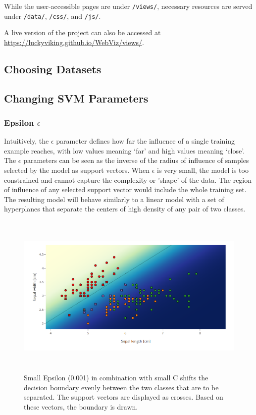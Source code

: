\documentclass{scrartcl}
\begin{document}
While the user-accessible pages are under \verb|/views/|,
necessary resources are served under
\verb|/data/|, \verb|/css/|, and \verb|/js/|.

A live version of the project can also be accessed at
\url{https://luckyviking.github.io/WebViz/views/}.

\subsection{Choosing Datasets}


\subsection{Changing SVM Parameters}

\subsubsection*{Epsilon $\epsilon$}
Intuitively, the $\epsilon$ parameter defines how far the influence of a single training example reaches, with low values meaning ‘far’ and high values meaning ‘close’. The $\epsilon$ parameters can be seen as the inverse of the radius of influence of samples selected by the model as support vectors. When $\epsilon$ is very small, the model is too constrained and cannot capture the complexity or 'shape' of the data. The region of influence of any selected support vector would include the whole training set. The resulting model will behave similarly to a linear model with a set of hyperplanes that separate the centers of high density of any pair of two classes. 

\begin{figure}%
	\centering
	\includegraphics[height=8cm]{IrisLin001_1}
	\caption{Small Epsilon (0.001) in combination with small C shifts the decision boundary evenly between the two classes that are to be separated. The support vectors are displayed as crosses. Based on these vectors, the boundary is drawn.}
	\label{fig:example}%
\end{figure}
\end{document}
